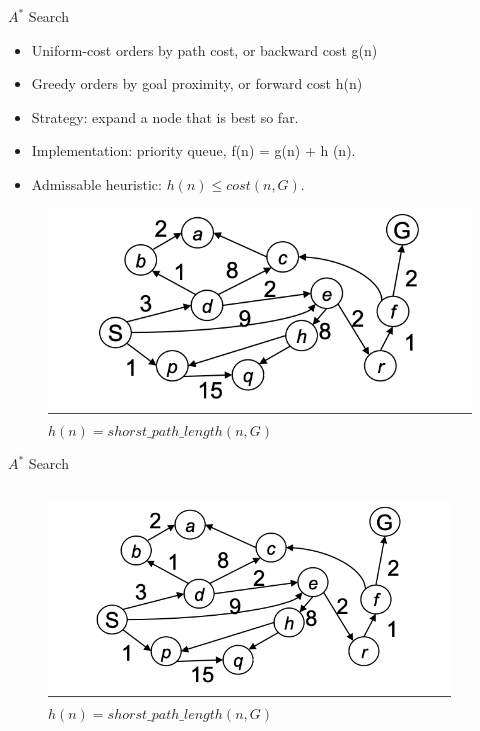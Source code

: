 \documentclass{beamer}
\begin{document}
\begin{frame}{$A^*$ Search}
\begin{itemize}
    \item Uniform-cost orders by path cost, or backward cost g(n)
    \item Greedy orders by goal proximity, or forward cost h(n)

    \pause
    \item Strategy: expand a node that is best so far.
    \pause
    \item Implementation: priority queue, f(n) = g(n) + h (n).
    \pause 
    \item Admissable heuristic: $h(n) \leq cost(n, G)$.
\end{itemize}

\pause
\begin{figure}[htpb]
    \centering
    \includegraphics[width=0.7\linewidth]{pic/astar-u.png}
    \caption{$h(n) = shorst\_path\_length(n,G)$}
\end{figure}

\end{frame}


\begin{frame}{$A^*$ Search}
\begin{columns}
    \begin{column}{.6\textwidth}
        \begin{figure}[htpb]
            \centering
            \includegraphics[width=1\linewidth]{pic/astar-u.png}
            \caption{$h(n) = shorst\_path\_length(n,G)$}
        \end{figure}
    \end{column}

    \begin{column}{.4\textwidth}

    \end{column}
\end{columns}
\end{frame}
\end{document}
